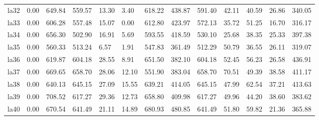 \begin{table}[htbp]
\begin{tabular}{lllllllllllll}
la32 & 0.00 & 649.84 & 559.57 & 13.30 & 3.40 & 618.22 & 438.87 & 591.40 & 42.11 & 40.59 & 26.86 & 340.05 \\
la33 & 0.00 & 606.28 & 557.48 & 15.07 & 0.00 & 612.80 & 423.97 & 572.13 & 35.72 & 51.25 & 16.70 & 316.17 \\
la34 & 0.00 & 656.30 & 502.90 & 16.91 & 5.69 & 593.55 & 418.59 & 530.10 & 25.68 & 38.35 & 25.33 & 397.38 \\
la35 & 0.00 & 560.33 & 513.24 & 6.57 & 1.91 & 547.83 & 361.49 & 512.29 & 50.79 & 36.55 & 26.11 & 319.07 \\
la36 & 0.00 & 619.87 & 604.18 & 28.55 & 8.91 & 651.50 & 382.10 & 604.18 & 52.45 & 56.23 & 26.58 & 436.91 \\
la37 & 0.00 & 669.65 & 658.70 & 28.06 & 12.10 & 551.90 & 383.04 & 658.70 & 70.51 & 49.39 & 38.58 & 411.17 \\
la38 & 0.00 & 640.13 & 645.15 & 27.09 & 15.55 & 639.21 & 414.05 & 645.15 & 47.99 & 62.54 & 37.21 & 413.63 \\
la39 & 0.00 & 708.52 & 617.27 & 29.36 & 12.73 & 658.80 & 409.98 & 617.27 & 49.96 & 44.20 & 38.60 & 383.62 \\
la40 & 0.00 & 670.54 & 641.49 & 21.11 & 14.89 & 680.93 & 480.85 & 641.49 & 51.80 & 59.82 & 21.36 & 365.88 \\
\bottomrule
\end{tabular}
\end{table}